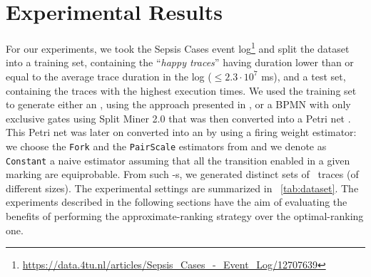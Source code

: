 \section{Experimental Results}\label{sec:exp}
For our experiments, we took the Sepsis Cases event log\footnote{{\small \url{https://data.4tu.nl/articles/Sepsis_Cases_-_Event_Log/12707639}}} and split the dataset into a training set, containing the ``\textit{happy traces}''  having duration lower than or equal to the average trace duration in the log ($\leq 2.3\cdot 10^{7}$ ms), and a test set, containing the traces with the highest execution times. We used the training set to generate either an \uswn, using the approach presented in \cite{RoggeSoltiAW13}, or a BPMN with only exclusive gates using Split Miner 2.0 \cite{AugustoCDRP19} that was then converted into a Petri net \cite{PPNFromLog}. This Petri net was later on converted into an \uswn by using a firing weight estimator: we choose the \texttt{Fork} and the \texttt{PairScale} estimators from \cite{spdwe} and we denote as \texttt{Constant} a naive estimator assuming that all the transition enabled in a given marking are equiprobable. %
From such \uswn-s, we generated distinct sets of \unravelled\ traces (of different sizes). The experimental settings are summarized in \tablename~\ref{tab:dataset}. The experiments described in the following sections have the aim of evaluating the benefits of performing the approximate-ranking strategy over the optimal-ranking one.

